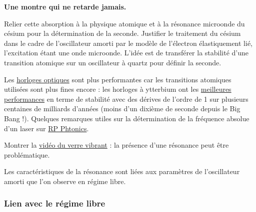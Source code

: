 \begin{slide}
\textbf{Une montre qui ne retarde jamais.}
\end{slide}

Relier cette absorption à la physique atomique et à la résonance microonde du césium pour la détermination de la seconde.
Justifier le traitement du césium dans le cadre de l'oscillateur amorti par le modèle de l'électron élastiquement lié, l'excitation étant une onde microonde.
L'idée est de transférer la stabilité d'une transition atomique sur un oscillateur à quartz pour définir la seconde.

\begin{remarque}
Les \href{https://www.rp-photonics.com/optical_clockworks.html}{horloges optiques} sont plus performantes car les transitions atomiques utilisées sont plus fines encore : les horloges à ytterbium ont les \href{https://www.nature.com/articles/s41586-018-0738-2.epdf?sharing_token=FIAZjmJMqixyHlimG5lZR9RgN0jAjWel9jnR3ZoTv0NOfvtdRGwNwsijc3L-wdrRb6DF0vb25L6JDgze8-Ez9_P7gtDhvd6Ohf2fGgppvCB0X-kg27ArE1M-_123JKobog97pnYcj6HXzgnQR8rvnEnh2szZWcsjs3iTQoltrq902DQaUqdwu-tfeoFpO2IP38lBfqV_hdqg28l1ptt7M-PeiTD59RRAR6YB4NH8cdhllMt46BYK03GkjoGNMHdUg-jFHfsZFxk8V2FOARslaavGtlPodYzx2Knkijyvf6sgup8zUfeTjvHaoHNKaM6y&tracking_referrer=ici.radio-canada.ca}{meilleures performances} en terme de stabilité avec des dérives de l'ordre de \unit{1}{\second} sur plusieurs centaines de milliards d'années (moins d'un dixième de seconde depuis le Big Bang !).
Quelques remarques utiles sur la détermination de la fréquence absolue d'un laser sur \href{https://www.rp-photonics.com/frequency_metrology.html}{RP Phtonics}.
\end{remarque}

\begin{slide}
Montrer la \href{https://www.youtube.com/watch?v=7cgZcbHmxm4}{vidéo du verre vibrant} : la présence d'une résonance peut être problématique.
\end{slide}

\begin{transition}
Les caractéristiques de la résonance sont liées aux paramètres de l'oscillateur amorti que l'on observe en régime libre.
\end{transition}

\subsubsection{Lien avec le régime libre}

